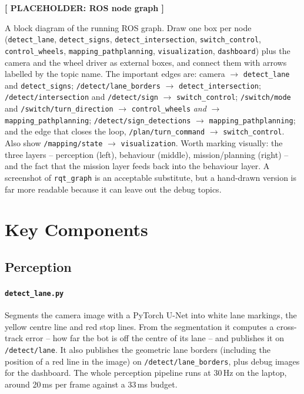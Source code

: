 \documentclass[10pt,a4paper]{article}
\newenvironment{placeholder}[1]
  {\par\medskip\noindent\begin{center}
   \setlength{\fboxsep}{6pt}%
   \begin{lrbox}{\placebox}%
   \begin{minipage}{0.88\linewidth}
   \centering\textbf{[ PLACEHOLDER: #1 ]}\\[0.8em]
   \raggedright\footnotesize}
  {\end{minipage}\end{lrbox}\fbox{\usebox{\placebox}}\end{center}\medskip}
\begin{document}
\begin{placeholder}{ROS node graph}
  A block diagram of the running ROS graph. Draw one box per node
  (\texttt{detect\_lane}, \texttt{detect\_signs}, \texttt{detect\_intersection},
  \texttt{switch\_control}, \texttt{control\_wheels},
  \texttt{mapping\_pathplanning}, \texttt{visualization}, \texttt{dashboard})
  plus the camera and the wheel driver as external boxes, and connect them with
  arrows labelled by the topic name. The important edges are:
  camera $\rightarrow$ \texttt{detect\_lane} and \texttt{detect\_signs};
  \texttt{/detect/lane\_borders} $\rightarrow$ \texttt{detect\_intersection};
  \texttt{/detect/intersection} and \texttt{/detect/sign} $\rightarrow$
  \texttt{switch\_control}; \texttt{/switch/mode} and
  \texttt{/switch/turn\_direction} $\rightarrow$ \texttt{control\_wheels}
  \emph{and} $\rightarrow$ \texttt{mapping\_pathplanning};
  \texttt{/detect/sign\_detections} $\rightarrow$
  \texttt{mapping\_pathplanning}; and the edge that closes the loop,
  \texttt{/plan/turn\_command} $\rightarrow$ \texttt{switch\_control}.
  Also show \texttt{/mapping/state} $\rightarrow$ \texttt{visualization}.
  Worth marking visually: the three layers -- perception (left), behaviour
  (middle), mission/planning (right) -- and the fact that the mission layer
  feeds back into the behaviour layer. A screenshot of \texttt{rqt\_graph} is an
  acceptable substitute, but a hand-drawn version is far more readable because
  it can leave out the debug topics.
\end{placeholder}

\section{Key Components}

\subsection{Perception}

\paragraph{\texttt{detect\_lane.py}} Segments the camera image with a PyTorch
U-Net into white lane markings, the yellow centre line and red stop lines. From
the segmentation it computes a cross-track error -- how far the bot is off the
centre of its lane -- and publishes it on \texttt{/detect/lane}. It also
publishes the geometric lane borders (including the position of a red line in
the image) on \texttt{/detect/lane\_borders}, plus debug images for the
dashboard. The whole perception pipeline runs at 30\,Hz on the laptop, around
20\,ms per frame against a 33\,ms budget.
\end{document}
